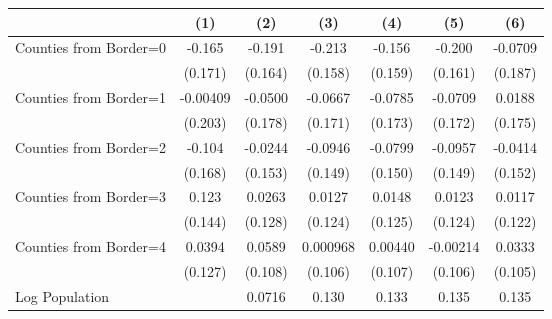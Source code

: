 {
\def\sym#1{\ifmmode^{#1}\else\(^{#1}\)\fi}
\begin{tabular}{l*{6}{c}}
\toprule
                    &\multicolumn{1}{c}{(1)}         &\multicolumn{1}{c}{(2)}         &\multicolumn{1}{c}{(3)}         &\multicolumn{1}{c}{(4)}         &\multicolumn{1}{c}{(5)}         &\multicolumn{1}{c}{(6)}         \\
\midrule
Counties from Border=0&      -0.165         &      -0.191         &      -0.213         &      -0.156         &      -0.200         &     -0.0709         \\
                    &     (0.171)         &     (0.164)         &     (0.158)         &     (0.159)         &     (0.161)         &     (0.187)         \\
\addlinespace
Counties from Border=1&    -0.00409         &     -0.0500         &     -0.0667         &     -0.0785         &     -0.0709         &      0.0188         \\
                    &     (0.203)         &     (0.178)         &     (0.171)         &     (0.173)         &     (0.172)         &     (0.175)         \\
\addlinespace
Counties from Border=2&      -0.104         &     -0.0244         &     -0.0946         &     -0.0799         &     -0.0957         &     -0.0414         \\
                    &     (0.168)         &     (0.153)         &     (0.149)         &     (0.150)         &     (0.149)         &     (0.152)         \\
\addlinespace
Counties from Border=3&       0.123         &      0.0263         &      0.0127         &      0.0148         &      0.0123         &      0.0117         \\
                    &     (0.144)         &     (0.128)         &     (0.124)         &     (0.125)         &     (0.124)         &     (0.122)         \\
\addlinespace
Counties from Border=4&      0.0394         &      0.0589         &    0.000968         &     0.00440         &    -0.00214         &      0.0333         \\
                    &     (0.127)         &     (0.108)         &     (0.106)         &     (0.107)         &     (0.106)         &     (0.105)         \\
\addlinespace
Log Population      &                     &      0.0716         &       0.130         &       0.133         &       0.135         &       0.135         \\

\end{tabular}}

